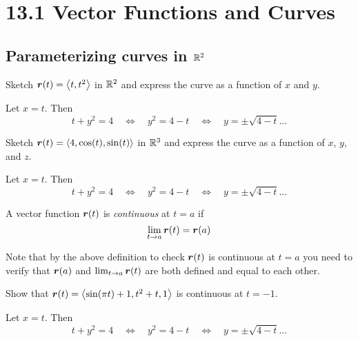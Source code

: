 \documentclass[12pt]{exam}
\newcommand{\qdate}{13.1 Vector Functions and Curves} %
\newcommand{\bif}{\quad\iff\quad}
\begin{document}
\section*{\qdate}


\subsection*{Parameterizing curves in \(\mathbb{R}^2\)}

\begin{questions}

\question Sketch \(\bm{r}(t)=\left\langle t,t^2 \right\rangle\) in  \(\mathbb{R}^2\) and express the curve as a function of  \(x\) and \(y\). 
        \ifprintanswers
            \begin{solution}
                Let \(x=t\). Then 
                \[
                    t+y^2 = 4 \bif y^2 = 4-t \bif y=\pm\sqrt{4-t}\ldots
                \]
            \end{solution}
        \else
            \vfill
        \fi

\question Sketch \(\bm{r}(t)=\left\langle 4,\cos(t),\sin(t) \right\rangle\) in \(\mathbb{R}^3\) and express the curve as a function of \(x\), \(y\), and \(z\).
        \ifprintanswers
            \begin{solution}
                Let \(x=t\). Then 
                \[
                    t+y^2 = 4 \bif y^2 = 4-t \bif y=\pm\sqrt{4-t}\ldots
                \]
            \end{solution}
        \else
            \vfill
        \fi

\begin{definition}
    A vector function \(\bm{r}(t)\) is \emph{continuous} at \(t=a\) if 
        \[
            \lim_{t\to a} \bm{r}(t) = \bm{r}(a)
        \]
\end{definition}

    Note that by the above definition to check \(\bm{r}(t)\) is continuous at \(t=a\) you need to verify that \(\bm{r}(a)\) and \(\lim_{t\to a}\bm{r}(t)\) are both defined and equal to each other.


\question Show that \(\bm{r}(t)=\left\langle \sin(\pi t)+1,t^2+t,1 \right\rangle\) is continuous at \(t=-1\).
        \ifprintanswers
            \begin{solution}
                Let \(x=t\). Then 
                \[
                    t+y^2 = 4 \bif y^2 = 4-t \bif y=\pm\sqrt{4-t}\ldots
                \]
            \end{solution}
        \else
            \vfill
        \fi

\newpage


\end{questions}
\end{document}
